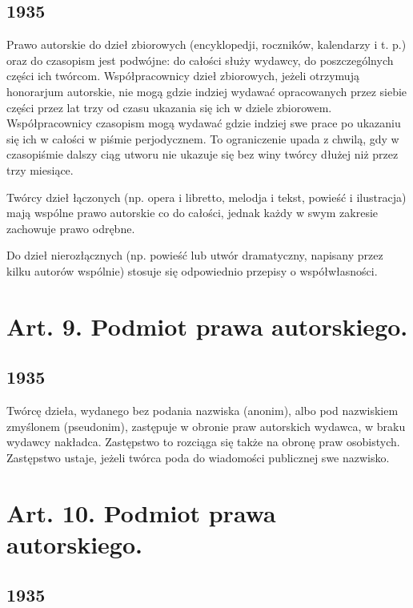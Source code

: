 \documentclass[withmarginpar]{book}
\begin{document}
\subsection{1935}
\label{sec:art.-8-1}

Prawo autorskie do dzieł zbiorowych (encyklopedji, roczników,
kalendarzy i t. p.) oraz do czasopism jest podwójne: do całości służy
wydawcy, do poszczególnych części ich twórcom. Współpracownicy dzieł
zbiorowych, jeżeli otrzymują honorarjum autorskie, nie mogą gdzie
indziej wydawać opracowanych przez siebie części przez lat trzy od
czasu ukazania się ich w dziele zbiorowem. Współpracownicy czasopism
mogą wydawać gdzie indziej swe prace po ukazaniu się ich w całości w
piśmie perjodycznem. To ograniczenie upada z chwilą, gdy w czasopiśmie
dalszy ciąg utworu nie ukazuje się bez winy twórcy dłużej niż przez
trzy miesiące.

Twórcy dzieł łączonych (np. opera i libretto, melodja i tekst, powieść
i ilustracja) mają wspólne prawo autorskie co do całości, jednak każdy
w swym zakresie zachowuje prawo odrębne.

Do dzieł nierozłącznych (np. powieść lub utwór dramatyczny, napisany
przez kilku autorów wspólnie) stosuje się odpowiednio przepisy o
współwłasności.

\section{Art.  9. Podmiot prawa autorskiego.}
\label{sec:art.-9}

\subsection{1935}
\label{sec:art.-9-1}

Twórcę dzieła, wydanego bez podania nazwiska (anonim), albo pod
nazwiskiem zmyślonem (pseudonim), zastępuje w obronie praw autorskich
wydawca, w braku wydawcy nakładca. Zastępstwo to rozciąga się także na
obronę praw osobistych. Zastępstwo ustaje, jeżeli twórca poda do
wiadomości publicznej swe nazwisko.

\section{Art.  10. Podmiot prawa autorskiego.}
\label{sec:art.-10}

\subsection{1935}
\label{sec:art.-10-1}
\end{document}
